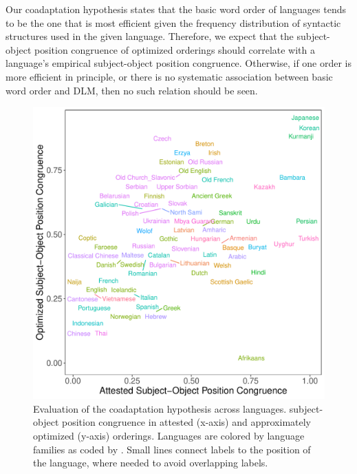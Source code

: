 \documentclass[9pt,twocolumn,twoside,lineno]{pnas-new}
\begin{document}
Our coadaptation hypothesis states that the basic word order of languages tends to be the one that is most efficient given the frequency distribution of syntactic structures used in the given language.
Therefore, we expect that the subject-object position congruence of optimized orderings should correlate with a language's empirical subject-object position congruence.
Otherwise, if one order is more efficient in principle, or there is no systematic association between basic word order and DLM, then no such relation should be seen.


\begin{figure}[h!]
    \centering
    \includegraphics[width=.75\textwidth]{../analysis/figures/fracion-optimized_DLM_2.6_format.pdf}
	\caption{Evaluation of the coadaptation hypothesis across languages. subject-object position congruence in attested (x-axis) and approximately optimized (y-axis) orderings. Languages are colored by language families as coded by \cite{zeman2020universal}. Small lines connect labels to the position of the language, where needed to avoid overlapping labels.} %
    \label{fig:study1}\label{fig:spoken}
\end{figure}
\end{document}
